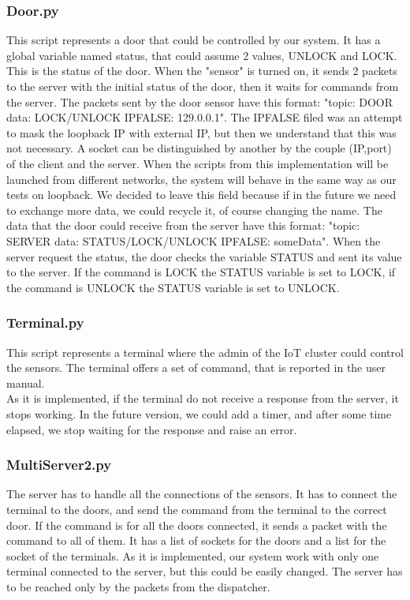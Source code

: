 \subsubsection{Door.py}
This script represents a door that could be controlled by our system. It has a global variable named status, that could assume 2 values, UNLOCK and LOCK.
This is the status of the door. When the "sensor" is turned on, it sends 2 packets to the server with the initial status of the door, then it waits for commands from the server. The packets sent by the door sensor have this format: "topic: DOOR data: LOCK/UNLOCK IPFALSE: 129.0.0.1". The IPFALSE filed was an attempt
to mask the loopback IP with external IP, but then we understand that this was not necessary. A socket can be distinguished by another by the couple (IP,port)
of the client and the server. When the scripts from this implementation will be launched from different networks, the system will behave in the same way as our tests on loopback. We decided to leave this field because if in the future we need to exchange more data, we could recycle it, of course changing the name.
The data that the door could receive from the server have this format: "topic: SERVER data: STATUS/LOCK/UNLOCK IPFALSE: someData". When the server
request the status, the door checks the variable STATUS and sent its value to the server. If the command is LOCK the STATUS variable is set to LOCK, if the command is UNLOCK the STATUS variable is set to UNLOCK.


\subsubsection{Terminal.py}
This script represents a terminal where the admin of the IoT cluster could control the sensors. The terminal offers a set of command, that is reported in the user manual.\\
As it is implemented, if the terminal do not receive a response from the server, it stops working. In the future version, we could add a timer, and after some time elapsed, we stop waiting for the response and raise an error.

\subsubsection{MultiServer2.py}
The server has to handle all the connections of the sensors. It has to connect the terminal to the doors, and send the command from the terminal to the correct door. If the command is for all the doors connected, it sends a packet with the command to all of them. It has a list of sockets for the doors and a list for the socket of the terminals. As it is implemented, our system work with only one terminal connected to the server, but this could be easily changed. The server has to be reached only by the packets from the dispatcher.


